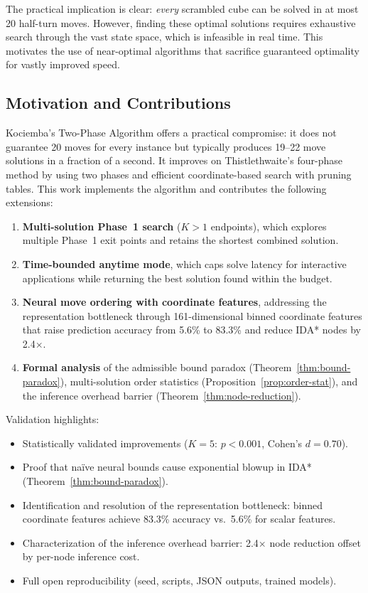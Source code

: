 \documentclass[conference]{IEEEtran}
\begin{document}
The practical implication is clear: \emph{every} scrambled cube can be solved in at most 20 half-turn moves. However, finding these optimal solutions requires exhaustive search through the vast state space, which is infeasible in real time. This motivates the use of near-optimal algorithms that sacrifice guaranteed optimality for vastly improved speed.

\subsection{Motivation and Contributions}
Kociemba's Two-Phase Algorithm offers a practical compromise: it does not guarantee 20 moves for every instance but typically produces 19--22 move solutions in a fraction of a second. It improves on Thistlethwaite's four-phase method by using two phases and efficient coordinate-based search with pruning tables. This work implements the algorithm and contributes the following extensions:

\begin{enumerate}[leftmargin=*]
  \item \textbf{Multi-solution Phase~1 search} ($K > 1$ endpoints), which explores multiple Phase~1 exit points and retains the shortest combined solution.
  \item \textbf{Time-bounded anytime mode}, which caps solve latency for interactive applications while returning the best solution found within the budget.
  \item \textbf{Neural move ordering with coordinate features}, addressing the representation bottleneck through 161-dimensional binned coordinate features that raise prediction accuracy from 5.6\% to 83.3\% and reduce IDA* nodes by 2.4$\times$.
  \item \textbf{Formal analysis} of the admissible bound paradox (Theorem~\ref{thm:bound-paradox}), multi-solution order statistics (Proposition~\ref{prop:order-stat}), and the inference overhead barrier (Theorem~\ref{thm:node-reduction}).
\end{enumerate}

Validation highlights:
\begin{itemize}[leftmargin=*]
  \item Statistically validated improvements ($K{=}5$: $p < 0.001$, Cohen's $d = 0.70$).
  \item Proof that na\"ive neural bounds cause exponential blowup in IDA* (Theorem~\ref{thm:bound-paradox}).
  \item Identification and resolution of the representation bottleneck: binned coordinate features achieve 83.3\% accuracy vs.\ 5.6\% for scalar features.
  \item Characterization of the inference overhead barrier: 2.4$\times$ node reduction offset by per-node inference cost.
  \item Full open reproducibility (seed, scripts, JSON outputs, trained models).
\end{itemize}
\end{document}
